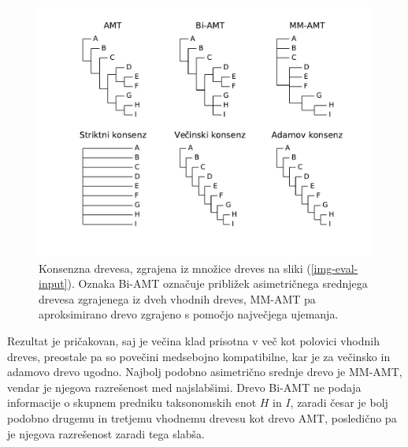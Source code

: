 \documentclass[a4paper, 12pt]{book}
\begin{document}
\begin{figure}[h!]
	\begin{center}
		\includegraphics[scale=0.65, clip=true, trim=1.5cm 1.5cm 1cm 0.8cm]{gfx/eval_gfx.pdf}
	\end{center}
	\caption{Konsenzna drevesa, zgrajena iz množice dreves na sliki (\ref{img-eval-input}). Oznaka Bi-AMT označuje približek asimetričnega srednjega drevesa zgrajenega iz dveh vhodnih dreves, MM-AMT pa aproksimirano drevo zgrajeno s pomočjo največjega ujemanja.}
	\label{img-eval-result}
\end{figure}

Rezultat je pričakovan, saj je večina klad prisotna v več kot polovici vhodnih dreves, preostale pa so povečini medsebojno kompatibilne, kar je za večinsko in adamovo drevo ugodno. Najbolj podobno asimetrično srednje drevo je MM-AMT, vendar je njegova razrešenost med najslabšimi. Drevo Bi-AMT ne podaja informacije o skupnem predniku taksonomskih enot $H$ in $I$, zaradi česar je bolj podobno drugemu in tretjemu vhodnemu drevesu kot drevo AMT, posledično pa je njegova razrešenost zaradi tega slabša. 
\end{document}
